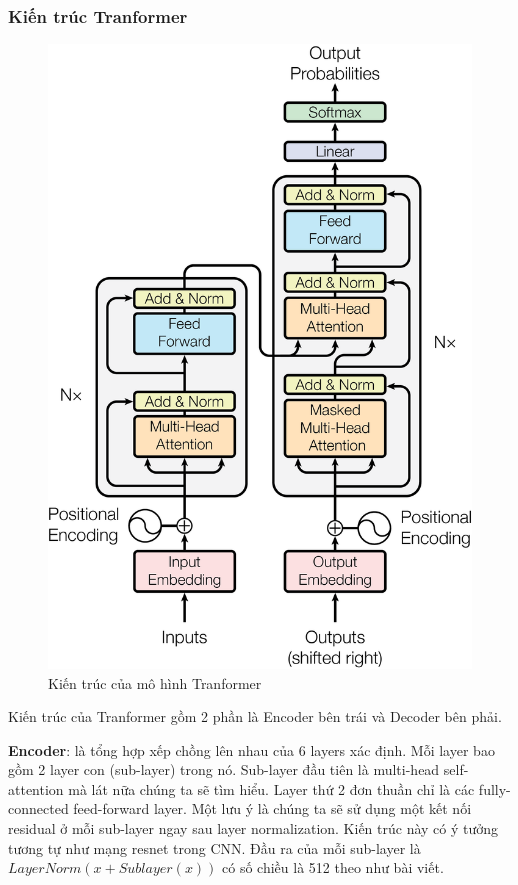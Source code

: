 \subsubsection{Kiến trúc Tranformer}
\begin{figure}[htb]
    \centering
    \includegraphics[width=\textwidth]{image/tranformer-architecture.png}
    \caption{Kiến trúc của mô hình Tranformer \cite{46201}}
    \label{figure:tranformer-architecture}
\end{figure}

Kiến trúc của Tranformer gồm 2 phần là Encoder bên trái và Decoder bên phải\cite{webpage23}.

\textbf{Encoder}: là tổng hợp xếp chồng lên nhau của 6 layers xác định. Mỗi layer bao gồm 2 layer con (sub-layer) trong nó. Sub-layer đầu tiên là multi-head self-attention mà lát nữa chúng ta sẽ tìm hiểu. Layer thứ 2 đơn thuần chỉ là các fully-connected feed-forward layer. Một lưu ý là chúng ta sẽ sử dụng một kết nối residual ở mỗi sub-layer ngay sau layer normalization. Kiến trúc này có ý tưởng tương tự như mạng resnet trong CNN. Đầu ra của mỗi sub-layer là $LayerNorm(x+Sublayer(x))$ có số chiều là 512 theo như bài viết.

